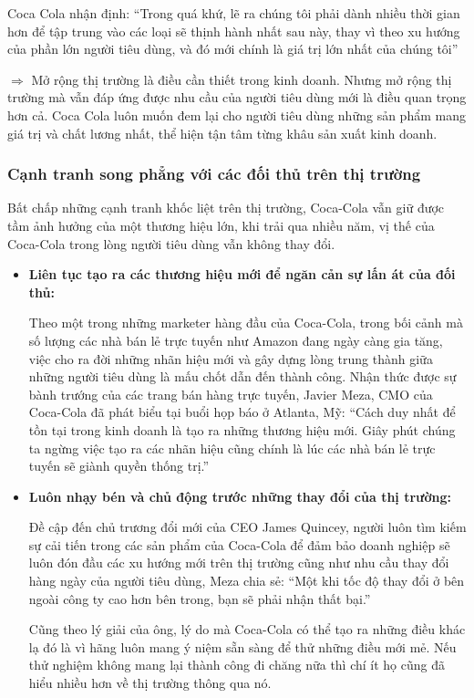 \documentclass{article}
\begin{document}
    \vspace{0.2cm}
    Coca Cola nhận định: “Trong quá khứ, lẽ ra chúng tôi phải dành nhiều thời gian hơn để tập trung vào các loại sẽ thịnh hành nhất sau này, thay vì theo xu hướng của phần lớn người tiêu dùng, và đó mới chính là giá trị lớn nhất của chúng tôi”

    \vspace{0.2cm}
    $\Rightarrow$ Mở rộng thị trường là điều cần thiết trong kinh doanh. Nhưng mở rộng thị trường mà vẫn đáp ứng được nhu cầu của người tiêu dùng mới là điều quan trọng hơn cả. Coca Cola luôn muốn đem lại cho người tiêu dùng những sản phẩm mang giá trị và chất lương nhất, thể hiện tận tâm từng khâu sản xuất kinh doanh.

    \subsubsection{Cạnh tranh song phẳng với các đối thủ trên thị trường}
    \vspace{0.2cm}
    Bất chấp những cạnh tranh khốc liệt trên thị trường, Coca-Cola vẫn giữ được tầm ảnh hưởng của một thương hiệu lớn, khi trải qua nhiều năm, vị thế của Coca-Cola trong lòng người tiêu dùng vẫn không thay đổi.
    \begin{itemize}
        \item \textbf{Liên tục tạo ra các thương hiệu mới để ngăn cản sự lấn át của đối thủ:}
        
        Theo một trong những marketer hàng đầu của Coca-Cola, trong bối cảnh mà số lượng các nhà bán lẻ trực tuyến như Amazon đang ngày càng gia tăng, việc cho ra đời những nhãn hiệu mới và gây dựng lòng trung thành giữa những người tiêu dùng là mấu chốt dẫn đến thành công. Nhận thức được sự bành trướng của các trang bán hàng trực tuyến, Javier Meza, CMO của Coca-Cola đã phát biểu tại buổi họp báo ở Atlanta, Mỹ: “Cách duy nhất để tồn tại trong kinh doanh là tạo ra những thương hiệu mới. Giây phút chúng ta ngừng việc tạo ra các nhãn hiệu cũng chính là lúc các nhà bán lẻ trực tuyến sẽ giành quyền thống trị.”
        \item \textbf{Luôn nhạy bén và chủ động trước những thay đổi của thị trường:}
        
        Đề cập đến chủ trương đổi mới của CEO James Quincey, người luôn tìm kiếm sự cải tiến trong các sản phẩm của Coca-Cola để đảm bảo doanh nghiệp sẽ luôn đón đầu các xu hướng mới trên thị trường cũng như nhu cầu thay đổi hàng ngày của người tiêu dùng, Meza chia sẻ: “Một khi tốc độ thay đổi ở bên ngoài công ty cao hơn bên trong, bạn sẽ phải nhận thất bại.” 

        Cũng theo lý giải của ông, lý do mà Coca-Cola có thể tạo ra những điều khác lạ đó là vì hãng luôn mang ý niệm sẵn sàng để thử những điều mới mẻ. Nếu thử nghiệm không mang lại thành công đi chăng nữa thì chí ít họ cũng đã hiểu nhiều hơn về thị trường thông qua nó.
    \end{itemize}
\end{document}
